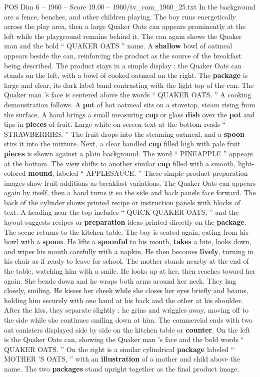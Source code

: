 \begin{textsample}{POS Dim 6 – 1960 – Score 19.00 – 1960/tv\_com\_1960\_25.txt}
In the background are a fence, benches, and other children playing.
The boy runs energetically across the play area, then a large Quaker Oats can appears prominently at the left while the playground remains behind it.
The can again shows the Quaker man and the bold “ QUAKER OATS ” name.
A \textbf{shallow} bowl of oatmeal appears beside the can, reinforcing the product as the source of the breakfast being described.
The product stays in a simple display : the Quaker Oats can stands on the left, with a bowl of cooked oatmeal on the right.
The \textbf{package} is large and clear, its dark label band contrasting with the light top of the can.
The Quaker man ’s face is centered above the words “ QUAKER OATS. ” A cooking demonstration follows.
A \textbf{pot} of hot oatmeal sits on a stovetop, steam rising from the surface.
A hand brings a small measuring \textbf{cup} or glass \textbf{dish} over the \textbf{pot} and tips in \textbf{pieces} of fruit.
Large white on-screen text at the bottom reads “ STRAWBERRIES. ” The fruit drops into the steaming oatmeal, and a \textbf{spoon} stirs it into the mixture.
Next, a clear handled \textbf{cup} filled high with pale fruit \textbf{pieces} is shown against a plain background.
The word “ PINEAPPLE ” appears at the bottom.
The view shifts to another similar \textbf{cup} filled with a smooth, light-colored \textbf{mound}, labeled “ APPLESAUCE. ” These simple product-preparation images show fruit additions as breakfast variations.
The Quaker Oats can appears again by itself, then a hand turns it so the side and back panels face forward.
The back of the cylinder shows printed recipe or instruction panels with blocks of text.
A heading near the top includes “ QUICK QUAKER OATS, ” and the layout suggests recipes or \textbf{preparation} ideas printed directly on the \textbf{package}.
The scene returns to the kitchen table.
The boy is seated again, eating from his bowl with a \textbf{spoon}.
He lifts a \textbf{spoonful} to his mouth, \textbf{takes} a bite, looks down, and wipes his mouth carefully with a napkin.
He then becomes \textbf{lively}, turning in his chair as if ready to leave for school.
The mother stands nearby at the end of the table, watching him with a smile.
He looks up at her, then reaches toward her again.
She bends down and he wraps both arms around her neck.
They hug closely, smiling.
He kisses her cheek while she closes her eyes briefly and beams, holding him securely with one hand at his back and the other at his shoulder.
After the kiss, they separate slightly ; he grins and wriggles away, moving off to the side while she continues smiling down at him.
The commercial ends with two oat canisters displayed side by side on the kitchen table or \textbf{counter}.
On the left is the Quaker Oats can, showing the Quaker man ’s face and the bold words “ QUAKER OATS. ” On the right is a similar cylindrical \textbf{package} labeled “ MOTHER ’S OATS, ” with an \textbf{illustration} of a mother and child above the name.
The two \textbf{packages} stand upright together as the final product image.

\end{textsample}

